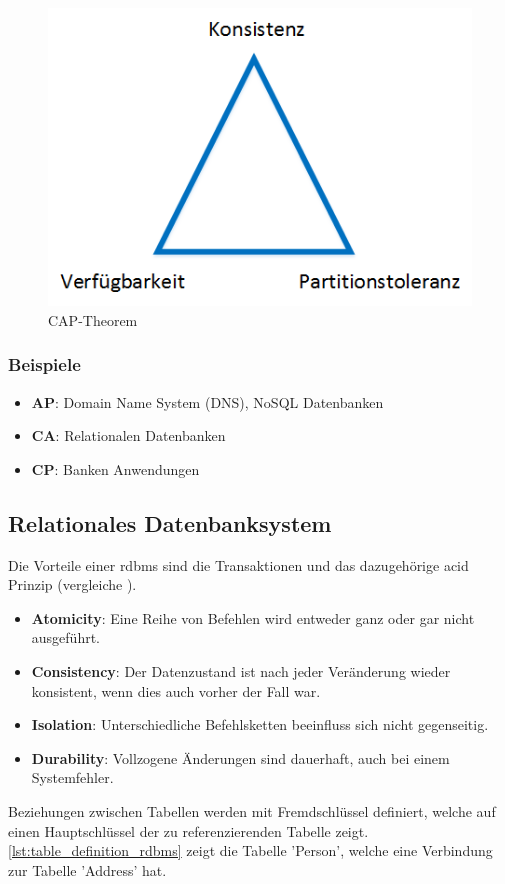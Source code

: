 \begin{figure}[h]
\centering
\includegraphics[scale=0.8]{images/visio/cap.png}
\caption[CAP-Theorem]{CAP-Theorem \selfmade{}}
\label{fig:cap}
\end{figure}

\subsubsection{Beispiele}

\begin{itemize}
	\item \textbf{AP}: Domain Name System (DNS), NoSQL Datenbanken
	\item \textbf{CA}: Relationalen Datenbanken
	\item \textbf{CP}: Banken Anwendungen
\end{itemize}

\subsection{Relationales Datenbanksystem}\label{rdbms}
Die Vorteile einer \gls{rdbms} sind die Transaktionen und das dazugehörige \gls{acid} Prinzip (vergleiche \cite{limited2010introduction}). 
\begin{itemize}
	\item \textbf{Atomicity}: Eine Reihe von Befehlen wird entweder ganz oder gar nicht ausgeführt.
	\item \textbf{Consistency}: Der Datenzustand ist nach jeder Veränderung wieder konsistent, wenn dies auch vorher der Fall war.
	\item \textbf{Isolation}: Unterschiedliche Befehlsketten beeinfluss sich nicht gegenseitig.
	\item \textbf{Durability}: Vollzogene Änderungen sind dauerhaft, auch bei einem Systemfehler.
\end{itemize}
Beziehungen zwischen Tabellen werden mit Fremdschlüssel definiert, welche auf einen Hauptschlüssel der zu referenzierenden Tabelle zeigt. \autoref{lst:table_definition_rdbms} zeigt die
Tabelle 'Person', welche eine Verbindung zur Tabelle 'Address' hat.


